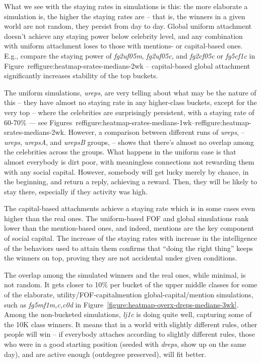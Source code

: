 \documentclass[10pt,oneside]{memoir}
\begin{document}
\begin{Spacing}{2}
What we see with the staying rates in simulations is this: the more elaborate a simulation is, the higher the staying rates are -- that is, the winners in a given world are not random, they persist from day to day.  Global uniform attachment doesn't achieve any staying power below celebrity level, and any combination with uniform attachment loses to those with mentions- or capital-based ones.  E.g., compare the staying power of {\itshape fg2uf05m}, {\itshape fg2uf05c}, and {\itshape fg2cf05c} or {\itshape fg5cf1c} in Figure~ref{figure:heatmap-srates-medians-2wk} -- capital-based global attachment significantly increases stability of the top buckets.


The uniform simulations, {\itshape ureps}, are very telling about what may be the nature of this -- they have almost no staying rate in any higher-class buckets, except for the very top -- where the celebrities are surprisingly persistent, with a staying rate of 60-70\% --- see  Figures~ref{figure:heatmap-srates-medians-1wk}--ref{figure:heatmap-srates-medians-2wk}.   However, a comparison between different runs of {\itshape ureps}, -- {\itshape ureps}, {\itshape urepsA}, and {\itshape urepsB} groups, -- shows that there's almost no overlap among the celebrities across the groups.  What happens in the uniform case is that almost everybody is dirt poor, with meaningless connections not rewarding them with any social capital.  However, somebody will get lucky merely by chance, in the beginning, and return a reply, achieving a reward.  Then, they will be likely to stay there, especially if they activity was high.


The capital-based attachments achieve a staying rate which is in some cases even higher than the real ones.  The uniform-based FOF and global simulations rank lower than the mention-based ones, and indeed, mentions are the key component of social capital.  The increase of the staying rates with increase in the intelligence of the behaviors used to attain them confirms that ``doing the right thing'' keeps the winners on top, proving they are not accidental under given conditions.


The overlap among the simulated winners and the real ones, while minimal, is not random.  It gets closer to 10\% per bucket of the upper middle classes for some of the elaborate, utility/FOF-capitalmention global-capital/mention simulations, such as {\itshape fg5mf1{m,c,c0d}} in Figure~\ref{figure:heatmap-overx-dreps-medians-3wk}.  Among the non-bucketed simulations, {\itshape lj1c} is doing quite well, capturing some of the 10K class winners.   It means that in a world with slightly different rules, other people will win -- if everybody attaches according to slightly different rules, those who were in a good starting position (seeded with {\itshape dreps}, show up on the same day), and are active enough (outdegree preserved), will fit better.



\end{Spacing}
\end{document}

